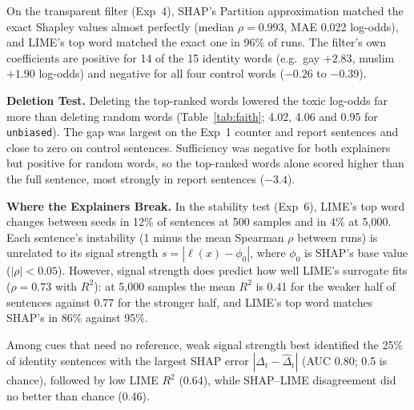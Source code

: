 On the transparent filter (Exp~4), SHAP's Partition approximation matched the exact Shapley values almost perfectly (median $\rho = 0.993$, MAE 0.022 log-odds), and LIME's top word matched the exact one in 96\% of runs. The filter's own coefficients are positive for 14 of the 15 identity words (e.g.\ gay $+2.83$, muslim $+1.90$ log-odds) and negative for all four control words ($-0.26$ to $-0.39$).

\smallskip
\noindent\textbf{Deletion Test.}
Deleting the top-ranked words lowered the toxic log-odds far more than deleting random words (Table~\ref{tab:faith}; 4.02, 4.06 and 0.95 for \texttt{unbiased}). The gap was largest on the Exp~1 counter and report sentences and close to zero on control sentences. Sufficiency was negative for both explainers but positive for random words, so the top-ranked words alone scored higher than the full sentence, most strongly in report sentences ($-3.4$).

\smallskip
\noindent\textbf{Where the Explainers Break.}
In the stability test (Exp~6), LIME's top word changes between seeds in 12\% of sentences at 500 samples and in 4\% at 5,000. Each sentence's instability (1 minus the mean Spearman $\rho$ between runs) is unrelated to its signal strength $s = |\ell(x) - \phi_0|$, where $\phi_0$ is SHAP's base value ($|\rho| < 0.05$). However, signal strength does predict how well LIME's surrogate fits ($\rho = 0.73$ with $R^2$): at 5,000 samples the mean $R^2$ is 0.41 for the weaker half of sentences against 0.77 for the stronger half, and LIME's top word matches SHAP's in 86\% against 95\%.

Among cues that need no reference, weak signal strength best identified the 25\% of identity sentences with the largest SHAP error $|\Delta_t - \hat{\Delta}_t|$ (AUC 0.80; 0.5 is chance), followed by low LIME $R^2$ (0.64), while SHAP--LIME disagreement did no better than chance (0.46).
